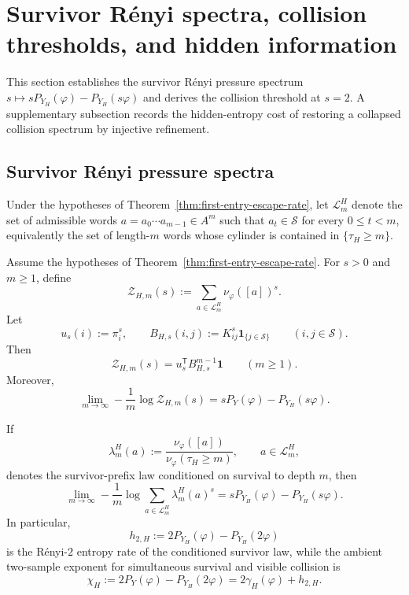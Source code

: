 \section{Survivor R\'enyi spectra, collision thresholds, and hidden information}\label{sec:double-budget}

This section establishes the survivor R\'enyi pressure spectrum
\(s\mapsto sP_{Y_H}(\varphi)-P_{Y_H}(s\varphi)\) and derives the
collision threshold at \(s=2\).  A supplementary subsection records the
hidden-entropy cost of restoring a collapsed collision spectrum by
injective refinement.

\subsection{Survivor R\'enyi pressure spectra}

Under the hypotheses of Theorem~\ref{thm:first-entry-escape-rate}, let
\(\mathcal L_m^H\) denote the set of admissible words
\(a=a_0\cdots a_{m-1}\in A^m\) such that \(a_t\in\mathcal S\) for every
\(0\leq t<m\), equivalently the set of length-\(m\) words whose cylinder
is contained in \(\{\tau_H\ge m\}\).

\begin{theorem}
\label{thm:survivor-renyi-pressure}
Assume the hypotheses of
Theorem~\ref{thm:first-entry-escape-rate}.  For \(s>0\) and \(m\geq 1\),
define
\[
  \mathcal Z_{H,m}(s)
  := \sum_{a\in\mathcal L_m^H}\nu_\varphi([a])^s.
\]
Let
\[
  u_s(i):=\pi_i^s,
  \qquad
  B_{H,s}(i,j):=K_{ij}^s\mathbf 1_{\{j\in\mathcal S\}}
  \qquad (i,j\in\mathcal S).
\]
Then
\[
  \mathcal Z_{H,m}(s)=u_s^{\mathsf T}B_{H,s}^{m-1}\mathbf 1
  \qquad (m\geq 1).
\]
Moreover,
\[
  \lim_{m\to\infty}
  -\frac1m\log \mathcal Z_{H,m}(s)
  = sP_Y(\varphi)-P_{Y_H}(s\varphi).
\]

If
\[
  \lambda_m^H(a)
  := \frac{\nu_\varphi([a])}{\nu_\varphi(\tau_H\ge m)},
  \qquad a\in\mathcal L_m^H,
\]
denotes the survivor-prefix law conditioned on survival to depth \(m\),
then
\[
  \lim_{m\to\infty}
  -\frac1m\log
  \sum_{a\in\mathcal L_m^H}\lambda_m^H(a)^s
  = sP_{Y_H}(\varphi)-P_{Y_H}(s\varphi).
\]
In particular,
\[
  h_{2,H}:=2P_{Y_H}(\varphi)-P_{Y_H}(2\varphi)
\]
is the R\'enyi-\(2\) entropy rate of the conditioned survivor law, while
the ambient two-sample exponent for simultaneous survival and visible
collision is
\[
  \chi_H:=2P_Y(\varphi)-P_{Y_H}(2\varphi)
        = 2\gamma_H(\varphi)+h_{2,H}.
\]
\end{theorem}

